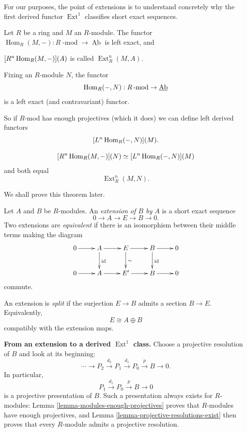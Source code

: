 \noindent
For our purposes, the point of extensions is to understand concretely why the first derived functor $\operatorname{Ext}^1$ classifies short exact sequences.

\noindent
Let $R$ be a ring and $M$ an $R$-module.
The functor
$
\operatorname{Hom}_R(M,-):
R\operatorname{-mod}
\to \underline{\operatorname{Ab}}
$
is left exact, and

$[R^n\mathop{\mathrm{Hom}}\nolimits_R(M,-)](A)$
is called $\operatorname{Ext}^n_R(M,A)$.

\begin{remark}
\label{remark-hom-functor-contravariant}
Fixing an $R$-module $N$,
the functor
$$
\mathop{\mathrm{Hom}}\nolimits_R(-,N):R\operatorname{-mod}
\to \underline{\operatorname{Ab}}
$$
is a left exact (and contravariant)
functor.
\end{remark}

\noindent
So if $R$-mod has enough projectives
(which it does) we can define left
derived functors
$$
[L^n\mathop{\mathrm{Hom}}\nolimits_R(-,N)](M).
$$

\begin{theorem}[Balancing]
\label{theorem-balancing}
$$
[R^n\mathop{\mathrm{Hom}}\nolimits_R(M,-)](N)
\simeq
[L^n\mathop{\mathrm{Hom}}\nolimits_R(-,N)](M)
$$
and both equal
$$
\operatorname{Ext}^n_R(M,N).
$$
\end{theorem}

\noindent
We shall prove this theorem later.

\begin{definition}
\label{definition-extension}
Let $A$ and $B$ be $R$-modules. An \emph{extension of $B$ by $A$} is a short exact sequence
$$
0\longrightarrow A\longrightarrow E\longrightarrow B\longrightarrow0.
$$
Two extensions are \emph{equivalent} if there is an isomorphism between their middle terms making the diagram
$$
\xymatrix{
0\ar[r]&A\ar[r]\ar[d]^{\mathrm{id}}&E\ar[r]\ar[d]^{\sim}&B\ar[r]\ar[d]^{\mathrm{id}}&0\\
0\ar[r]&A\ar[r]&E'\ar[r]&B\ar[r]&0
}
$$
commute.
\end{definition}

\begin{definition}
\label{definition-split-extension}
An extension is \emph{split} if the surjection $E\to B$ admits a section $B\to E$. Equivalently,
$$
E\cong A\oplus B
$$
compatibly with the extension maps.
\end{definition}

\medskip\noindent
\textbf{From an extension to a derived $\operatorname{Ext}^1$ class.}
Choose a projective resolution of $B$ and look at its beginning:
$$
\cdots\longrightarrow P_2\xrightarrow{d_2}P_1\xrightarrow{d_1}P_0\xrightarrow{p}B\longrightarrow0.
$$
In particular,
$$
P_1\xrightarrow{d_1}P_0\xrightarrow{p}B\longrightarrow0
$$
is a projective presentation of $B$. Such a presentation always exists for $R$-modules: Lemma
\ref{lemma-modules-enough-projectives} proves that $R$-modules have enough projectives, and Lemma
\ref{lemma-projective-resolutions-exist} then proves that every $R$-module admits a projective resolution.

